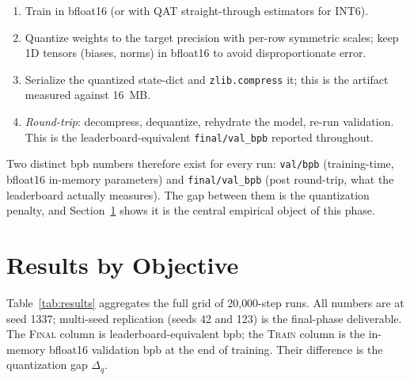 \documentclass[11pt, letterpaper]{article}
\begin{document}
\begin{enumerate}[leftmargin=*, topsep=0pt, itemsep=1pt]
    \item Train in bfloat16 (or with QAT straight-through
          estimators for INT6).
    \item Quantize weights to the target precision with per-row
          symmetric scales; keep 1D tensors (biases, norms) in
          bfloat16 to avoid disproportionate error.
    \item Serialize the quantized state-dict and \texttt{zlib.compress}
          it; this is the artifact measured against 16~MB.
    \item \emph{Round-trip}: decompress, dequantize, rehydrate
          the model, re-run validation. This is the leaderboard-equivalent
          \texttt{final/val\_bpb} reported throughout.
\end{enumerate}

Two distinct bpb numbers therefore exist for every run:
\texttt{val/bpb} (training-time, bfloat16 in-memory parameters)
and \texttt{final/val\_bpb} (post round-trip, what the leaderboard
actually measures). The gap between them is the quantization
penalty, and Section~\ref{sec:results} shows it is the central
empirical object of this phase.

\section{Results by Objective}
\label{sec:results}

Table~\ref{tab:results} aggregates the full grid of 20{,}000-step
runs. All numbers are at seed 1337; multi-seed replication
(seeds 42 and 123) is the final-phase deliverable. The
\textsc{Final} column is leaderboard-equivalent bpb; the
\textsc{Train} column is the in-memory bfloat16 validation
bpb at the end of training. Their difference is the
quantization gap $\Delta_q$.
\end{document}
